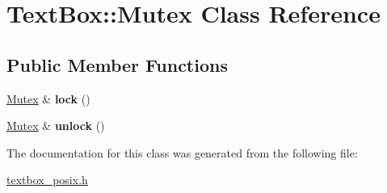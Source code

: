 \hypertarget{a00036}{}\section{Text\+Box\+:\+:Mutex Class Reference}
\label{a00036}
\subsection*{Public Member Functions}
\begin{DoxyCompactItemize}
\item 
\mbox{\label{a00036_acf898d827d4c3c79e0f7ce18ae594814}} 
\hyperlink{a00036}{Mutex} \& {\bfseries lock} ()
\item 
\mbox{\label{a00036_a4789aa2933baf457108b9c1f4b9f6c4f}} 
\hyperlink{a00036}{Mutex} \& {\bfseries unlock} ()
\end{DoxyCompactItemize}


The documentation for this class was generated from the following file\+:\begin{DoxyCompactItemize}
\item 
\hyperlink{a00008}{textbox\+\_\+posix.\+h}\end{DoxyCompactItemize}
